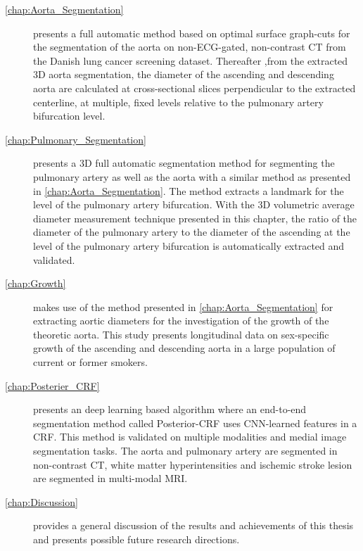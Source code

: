 \begin{description}
    \item[\cref{chap:Aorta_Segmentation}] presents a full automatic method based on optimal surface graph-cuts for the segmentation of the aorta on non-ECG-gated, non-contrast CT from the Danish lung cancer screening dataset. Thereafter ,from the extracted 3D aorta segmentation, the diameter of the ascending and descending aorta are calculated at cross-sectional slices perpendicular to the extracted centerline, at multiple, fixed levels relative to the pulmonary artery bifurcation level.    

    \item[\cref{chap:Pulmonary_Segmentation}] presents a 3D full automatic segmentation method for segmenting the pulmonary artery as well as the aorta with a similar method as presented in \cref{chap:Aorta_Segmentation}. The method extracts a landmark for the level of the pulmonary artery bifurcation. With the 3D volumetric average diameter measurement technique presented in this chapter, the ratio of the diameter of the pulmonary artery to the diameter of the ascending at the level of the pulmonary artery bifurcation is automatically extracted and validated.

    \item[\cref{chap:Growth}] makes use of the method presented in \cref{chap:Aorta_Segmentation} for extracting aortic diameters for the investigation of the growth of the theoretic aorta. This study presents longitudinal data on sex-specific growth of the ascending and descending aorta in a large population of current or former smokers. 
    
    
    \item[\cref{chap:Posterier_CRF}] presents an deep learning based algorithm where an end-to-end segmentation method called Posterior-CRF uses CNN-learned features in a CRF. This method is validated on multiple modalities and medial image segmentation tasks. The aorta and pulmonary artery are segmented in non-contrast CT, white matter hyperintensities and ischemic stroke lesion are segmented in multi-modal MRI. 
    
    \item[\cref{chap:Discussion}] provides a general discussion of the results and achievements of this thesis and presents possible future research directions.

\end{description}

